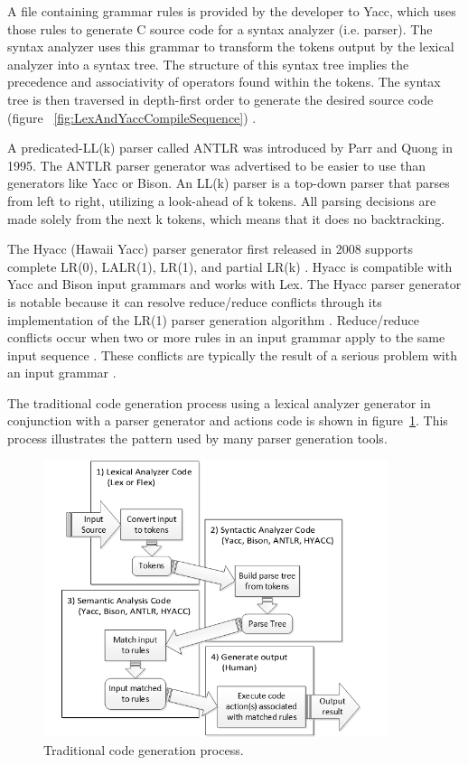 \indent
A file containing grammar rules is provided by the developer to Yacc, which uses those rules to generate C source code for a syntax analyzer (i.e. parser).  The syntax analyzer uses this grammar to transform the tokens output by the lexical analyzer into a syntax tree.  The structure of this syntax tree implies the precedence and associativity of operators found within the tokens.  The syntax tree is then traversed in depth-first order to generate the desired source code (figure ~\ref{fig:LexAndYaccCompileSequence}) \cite{niemann_01}.

\indent
A predicated-LL(k) parser called ANTLR \cite{parr_01} was introduced by Parr and Quong in 1995.  The ANTLR parser generator was advertised to be easier to use than generators like Yacc or Bison.  An LL(k) parser is a top-down parser that parses from left to right, utilizing a look-ahead of k tokens.  All parsing decisions are made solely from the next k tokens, which means that it does no backtracking.

\indent
The Hyacc (Hawaii Yacc) parser generator first released in 2008 supports complete LR(0), LALR(1), LR(1), and partial LR(k) \cite{chen_01,chen_02}.  Hyacc is compatible with Yacc and Bison input grammars and works with Lex.  The Hyacc parser generator is notable because it can resolve reduce/reduce conflicts through its implementation of the LR(1) parser generation algorithm \cite{chen_01}.  Reduce/reduce conflicts occur when two or more rules in an input grammar apply to the same input sequence \cite{free_01}.  These conflicts are typically the result of a serious problem with an input grammar \cite{free_01}.

\indent
The traditional code generation process using a lexical analyzer generator in conjunction with a parser generator and actions code is shown in figure~\ref{fig:TraditionalCodeGenProcess}.  This process illustrates the pattern used by many parser generation tools.

\begin{figure}[h!]
\centering
\includegraphics[width=0.9\textwidth]{figures/TraditionalCodeGenProcess.png}
\caption{Traditional code generation process.}
\label{fig:TraditionalCodeGenProcess}
\end{figure}

